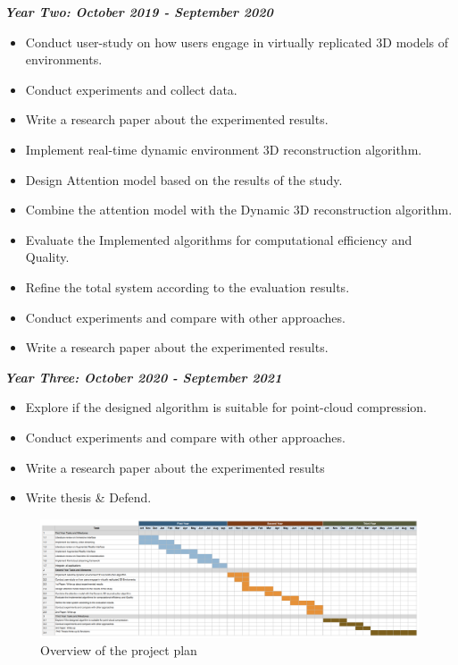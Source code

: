 

\textbf{\textit{Year Two: October 2019 - September 2020}}
\begin{itemize}
    \item Conduct user-study on how users engage in virtually replicated 3D models of environments.
    \item Conduct experiments and collect data.
    \item Write a research paper about the experimented results.
    \item Implement real-time dynamic environment 3D reconstruction algorithm.
    \item Design Attention model based on the results of the study.
    \item Combine the attention model with the Dynamic 3D reconstruction algorithm.
    \item Evaluate the Implemented algorithms for computational efficiency and Quality. 
    \item Refine the total system according to the evaluation results.
    \item Conduct experiments and compare with other approaches.
    \item Write a research paper about the experimented results.
\end{itemize}

\textbf{\textit{Year Three: October 2020 - September 2021}}
\begin{itemize}
    \item Explore if the designed algorithm is suitable for point-cloud compression.
    \item Conduct experiments and compare with other approaches.
    \item Write a research paper about the experimented results
    \item Write thesis & Defend.
\end{itemize} 

\begin{figure}
     \includegraphics[scale=0.5]{images/GantChart_Table.PNG}
 \caption{Overview of the project plan}
    \label{fig:Plan}
\end{figure}